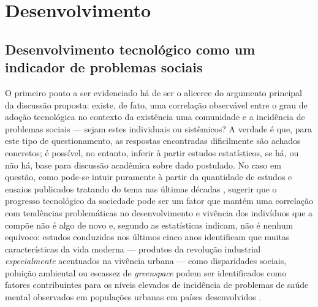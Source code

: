 \section{Desenvolvimento}

\subsection{Desenvolvimento tecnológico como um indicador de problemas sociais}

O primeiro ponto a ser evidenciado há de ser o alicerce do argumento principal da discussão proposta: existe, de fato,
uma correlação observável entre o grau de adoção tecnológica no contexto da existência uma comunidade e a incidência de
problemas sociais --- sejam estes individuais ou sistêmicos? A verdade é que, para este tipo de questionamento, as
respostas encontradas dificilmente são achados concretos; é possível, no entanto, inferir à partir estudos estatísticos, se
há, ou não há, base para discussão acadêmica sobre dado postulado. No caso em questão, como pode-se intuir puramente à partir
da quantidade de estudos e ensaios publicados tratando do tema nas últimas décadas
\cite{secretariat1977,marien1977415}, sugerir que o progresso tecnológico da sociedade pode
ser um fator que mantém uma correlação com tendências problemáticas no desenvolvimento e vivência dos indivíduos que a compõe
não é algo de novo e, segundo as estatísticas indicam, não é nenhum equívoco: estudos conduzidos nos últimos cinco anos
identificam que muitas características da vida moderna --- produtos da revolução industrial \textit{especialmente} acentuados na
vivência urbana --- como disparidades sociais, poluição ambiental ou escassez de \textit{greenspace} podem ser
identificados como fatores contribuintes para os níveis elevados de incidência de problemas de saúde mental observados
em populações urbanas em países desenvolvidos \cite[1]{XU2023299}.


